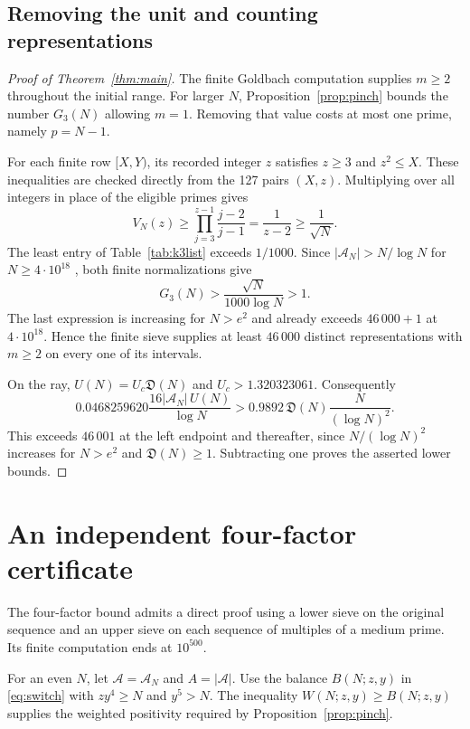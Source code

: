 \documentclass[11pt]{article}
\theoremstyle{remark}\newtheorem{remark}[theorem]{Remark}
\begin{document}
\subsection{Removing the unit and counting representations}
\begin{proof}[Proof of Theorem~\ref{thm:main}]
The finite Goldbach computation supplies $m\ge2$ throughout the initial range. For larger $N$, Proposition~\ref{prop:pinch} bounds the number $G_3(N)$ allowing $m=1$. Removing that value costs at most one prime, namely $p=N-1$.

For each finite row $[X,Y)$, its recorded integer $z$ satisfies $z\ge3$ and $z^2\le X$. These inequalities are checked directly from the 127 pairs $(X,z)$. Multiplying over all integers in place of the eligible primes gives
\[
 V_N(z)\ge \prod_{j=3}^{z-1}\frac{j-2}{j-1}
 =\frac1{z-2}\ge\frac1{\sqrt N}.
\]
The least entry of Table~\ref{tab:k3list} exceeds $1/1000$. Since $|\mathcal A_N|>N/\log N$ for $N\ge4\cdot10^{18}$ \cite[Lemma~3.1]{JS}, both finite normalizations give
\[
 G_3(N)>\frac{\sqrt N}{1000\log N}>1 .
\]
The last expression is increasing for $N>e^2$ and already exceeds $46\,000+1$ at $4\cdot10^{18}$. Hence the finite sieve supplies at least $46\,000$ distinct representations with $m\ge2$ on every one of its intervals.

On the ray, $U(N)=U_c\mathfrak D(N)$ and $U_c>1.320323061$. Consequently
\[
 0.0468259620\frac{16|\mathcal A_N|\,U(N)}{\log N}
 >0.9892\,\mathfrak D(N)\frac{N}{(\log N)^2}.
\]
This exceeds $46\,001$ at the left endpoint and thereafter, since $N/(\log N)^2$ increases for $N>e^2$ and $\mathfrak D(N)\ge1$. Subtracting one proves the asserted lower bounds.
\end{proof}

\section{An independent four-factor certificate}\label{sec:k4}

The four-factor bound admits a direct proof using a lower sieve on the original sequence and an upper sieve on each sequence of multiples of a medium prime. Its finite computation ends at $10^{500}$.

For an even $N$, let $\mathcal A=\mathcal A_N$ and $A=|\mathcal A|$. Use the balance $B(N;z,y)$ in \eqref{eq:switch} with $zy^4\ge N$ and $y^5>N$. The inequality $W(N;z,y)\ge B(N;z,y)$ supplies the weighted positivity required by Proposition~\ref{prop:pinch}.
\end{document}
